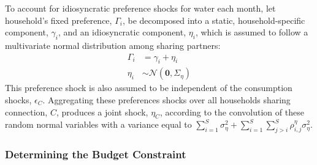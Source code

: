 \documentclass[12pt]{article}
\begin{document}
To account for idiosyncratic preference shocks for water each month, let household's fixed preference, $\Gamma_{i}$, be decomposed into a static, household-specific component, $\gamma_i$, and an idiosyncratic component, $\eta_{i}$, which is assumed to follow a multivariate normal distribution among sharing partners:
\begin{align*}
\Gamma_{i} &= \gamma_i + \eta_{i} \\
\eta_{i} &\sim \mathcal{N} (\textbf{0},\Sigma_{\eta}) 
\end{align*}
This preference shock is also assumed to be independent of the consumption shocks, $\epsilon_C$.  Aggregating these preferences shocks over all households sharing connection, $C$, produces a joint shock, $\eta_C$, according to the convolution of these random normal variables with a variance equal to $\sum_{i=1}^{S} \sigma_{\eta}^2 + \sum_{i=1}^{S} \sum_{j>i}^{S} \rho^{\eta}_{i,j} \sigma_{\eta}^2$.





\subsubsection{Determining the Budget Constraint}
\end{document}

